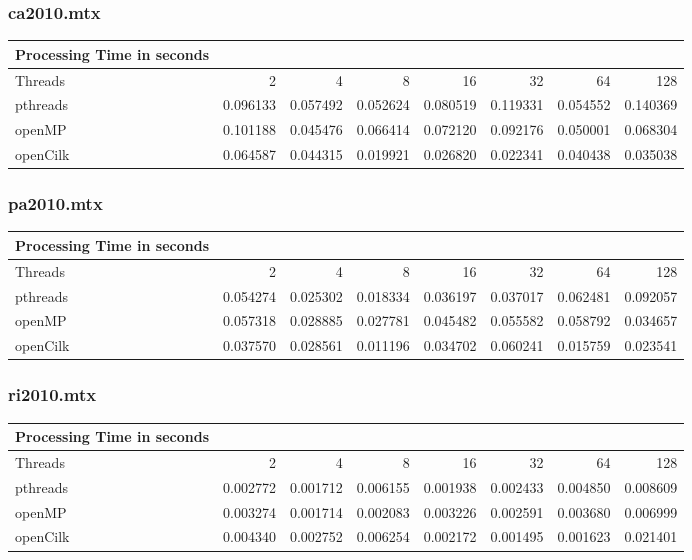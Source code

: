 \documentclass[11pt]{article}
\begin{document}
\subsubsection{ca2010.mtx}
\label{sec:org056a986}
\begin{center}
\begin{tabular}{lrrrrrrr}
\hline
Processing Time in seconds &  &  &  &  &  &  & \\[0pt]
\hline
Threads & 2 & 4 & 8 & 16 & 32 & 64 & 128\\[0pt]
\hline
pthreads & 0.096133 & 0.057492 & 0.052624 & 0.080519 & 0.119331 & 0.054552 & 0.140369\\[0pt]
openMP & 0.101188 & 0.045476 & 0.066414 & 0.072120 & 0.092176 & 0.050001 & 0.068304\\[0pt]
openCilk & 0.064587 & 0.044315 & 0.019921 & 0.026820 & 0.022341 & 0.040438 & 0.035038\\[0pt]
\hline
\end{tabular}
\end{center}
\subsubsection{pa2010.mtx}
\label{sec:orgec2e9d0}
\begin{center}
\begin{tabular}{lrrrrrrr}
\hline
Processing Time in seconds &  &  &  &  &  &  & \\[0pt]
\hline
Threads & 2 & 4 & 8 & 16 & 32 & 64 & 128\\[0pt]
\hline
pthreads & 0.054274 & 0.025302 & 0.018334 & 0.036197 & 0.037017 & 0.062481 & 0.092057\\[0pt]
openMP & 0.057318 & 0.028885 & 0.027781 & 0.045482 & 0.055582 & 0.058792 & 0.034657\\[0pt]
openCilk & 0.037570 & 0.028561 & 0.011196 & 0.034702 & 0.060241 & 0.015759 & 0.023541\\[0pt]
\hline
\end{tabular}
\end{center}
\subsubsection{ri2010.mtx}
\label{sec:orge4823ff}
\begin{center}
\begin{tabular}{lrrrrrrr}
\hline
Processing Time in seconds &  &  &  &  &  &  & \\[0pt]
\hline
Threads & 2 & 4 & 8 & 16 & 32 & 64 & 128\\[0pt]
\hline
pthreads & 0.002772 & 0.001712 & 0.006155 & 0.001938 & 0.002433 & 0.004850 & 0.008609\\[0pt]
openMP & 0.003274 & 0.001714 & 0.002083 & 0.003226 & 0.002591 & 0.003680 & 0.006999\\[0pt]
openCilk & 0.004340 & 0.002752 & 0.006254 & 0.002172 & 0.001495 & 0.001623 & 0.021401\\[0pt]
\hline
\end{tabular}
\end{center}
\end{document}
